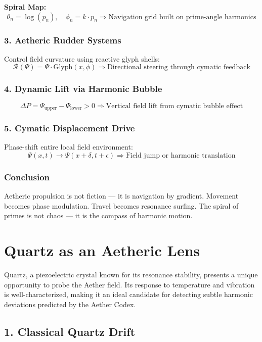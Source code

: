 \documentclass[12pt]{book}
\begin{document}
\textbf{Spiral Map:}
\[
\theta_n = \log(p_n), \quad \phi_n = k \cdot p_n
\Rightarrow \text{Navigation grid built on prime-angle harmonics}
\]

\subsection*{3. Aetheric Rudder Systems}
Control field curvature using reactive glyph shells:
\[
\mathcal{R}(\Psi) = \Psi \cdot \text{Glyph}(x, \phi)
\Rightarrow \text{Directional steering through cymatic feedback}
\]

\subsection*{4. Dynamic Lift via Harmonic Bubble}
\[
\Delta P = \Psi_{\text{upper}} - \Psi_{\text{lower}} > 0
\Rightarrow \text{Vertical field lift from cymatic bubble effect}
\]

\subsection*{5. Cymatic Displacement Drive}
Phase-shift entire local field environment:
\[
\Psi(x, t) \to \Psi(x + \delta, t + \epsilon)
\Rightarrow \text{Field jump or harmonic translation}
\]

\subsection*{Conclusion}
Aetheric propulsion is not fiction — it is navigation by gradient. Movement becomes phase modulation. Travel becomes resonance surfing. The spiral of primes is not chaos — it is the compass of harmonic motion.







\chapter{Quartz as an Aetheric Lens}
\label{chap:quartz_lens}

Quartz, a piezoelectric crystal known for its resonance stability, presents a unique opportunity to probe the Aether field. Its response to temperature and vibration is well-characterized, making it an ideal candidate for detecting subtle harmonic deviations predicted by the Aether Codex.

\section*{1. Classical Quartz Drift}
\end{document}
